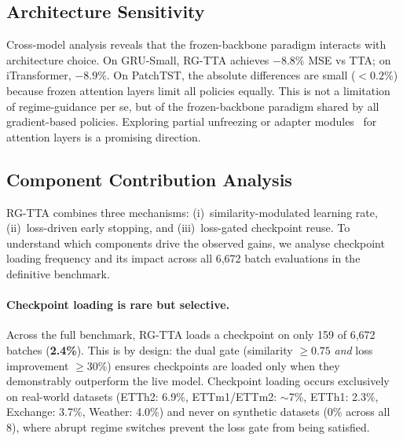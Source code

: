 \documentclass[journal]{IEEEtran}
\begin{document}
\begin{table}[t]
\centering
\caption{Ablation: similarity metric choice. The ensemble is more robust than any single metric.}
\label{tab:sim_ablation}
\small
{}%
\end{table}

\subsection{Architecture Sensitivity}

Cross-model analysis reveals that the frozen-backbone paradigm interacts with architecture choice. On GRU-Small, RG-TTA achieves $-8.8\%$ MSE vs TTA; on iTransformer, $-8.9\%$. On PatchTST, the absolute differences are small ($<0.2\%$) because frozen attention layers limit all policies equally. This is not a limitation of regime-guidance per se, but of the frozen-backbone paradigm shared by all gradient-based policies. Exploring partial unfreezing or adapter modules~\cite{houlsby2019adapters} for attention layers is a promising direction.

\subsection{Component Contribution Analysis}
\label{sec:component_contribution}

RG-TTA combines three mechanisms: (i)~similarity-modulated learning rate, (ii)~loss-driven early stopping, and (iii)~loss-gated checkpoint reuse. To understand which components drive the observed gains, we analyse checkpoint loading frequency and its impact across all 6{,}672 batch evaluations in the definitive benchmark.

\paragraph{Checkpoint loading is rare but selective.} Across the full benchmark, RG-TTA loads a checkpoint on only 159 of 6{,}672 batches (\textbf{2.4\%}). This is by design: the dual gate (similarity $\geq 0.75$ \emph{and} loss improvement $\geq 30\%$) ensures checkpoints are loaded only when they demonstrably outperform the live model. Checkpoint loading occurs exclusively on real-world datasets (ETTh2: 6.9\%, ETTm1/ETTm2: $\sim$7\%, ETTh1: 2.3\%, Exchange: 3.7\%, Weather: 4.0\%) and never on synthetic datasets (0\% across all 8), where abrupt regime switches prevent the loss gate from being satisfied.
\end{document}
